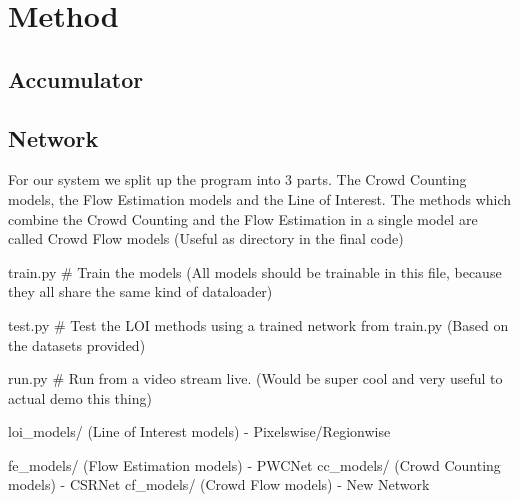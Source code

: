 \chapter{Method}

\section{Accumulator}

\section{Network}


For our system we split up the program into 3 parts. The Crowd Counting models, the Flow Estimation models and the Line of Interest. The methods which combine the Crowd Counting and the Flow Estimation in a single model are called Crowd Flow models (Useful as directory in the final code)

train.py \# Train the models (All models should be trainable in this file, because they all share the same kind of dataloader)

test.py \# Test the LOI methods using a trained network from train.py (Based on the datasets provided)

run.py \# Run from a video stream live. (Would be super cool and very useful to actual demo this thing)

loi\_models/ (Line of Interest models) - Pixelswise/Regionwise

fe\_models/ (Flow Estimation models) - PWCNet
cc\_models/ (Crowd Counting models) - CSRNet
cf\_models/ (Crowd Flow models) - New Network

